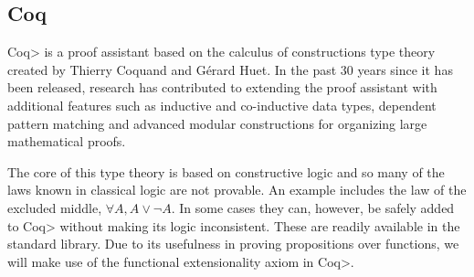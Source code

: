 \subsection{Coq}

\<Coq> is a proof assistant based on the calculus of constructions type theory created by Thierry Coquand and G\'{e}rard Huet\cite{Coquand1988}.
In the past 30 years since it has been released, research has contributed to extending the proof assistant with additional features such as inductive and co-inductive data types\cite{Coquand1990}, dependent pattern matching\cite{Sozeau2010} and advanced modular constructions for organizing large mathematical proofs\cite{Sozeau2008}\cite{Mahboubi2013}.

The core of this type theory is based on constructive logic and so many of the laws known in classical logic are not provable.
An example includes the law of the excluded middle, $\forall A, A \vee \neg A$.
In some cases they can, however, be safely added to \<Coq> without making its logic inconsistent. These are readily available in the standard library.
Due to its usefulness in proving propositions over functions, we will make use of the functional extensionality axiom in \<Coq>.



